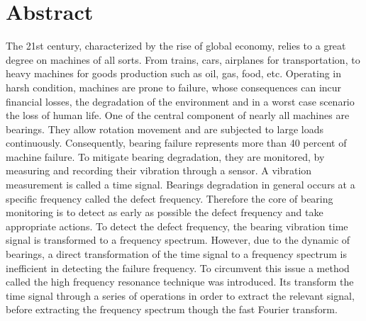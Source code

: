 \documentclass[../Main/thesis.tex]{subfiles}
\begin{document}
\null\vfill
{}
\chapter*{Abstract}

The 21st century, characterized by the rise of global economy, relies to a great degree on machines of all sorts. From trains, cars, airplanes for transportation, to heavy machines for goods production such as oil, gas, food, etc. Operating in harsh condition, machines are prone to failure, whose consequences can incur financial losses, the degradation of the environment and in a worst case scenario the loss of human life. 
\justify
 One of the central component of nearly all machines are bearings. They allow rotation movement and are subjected to large loads continuously. Consequently, bearing failure represents more than 40 percent of machine failure. To mitigate bearing degradation, they are monitored, by measuring and recording their vibration through a sensor. A vibration measurement is called a time signal. Bearings degradation in general occurs at a specific frequency called the defect frequency. Therefore the core of bearing monitoring is to detect as early as possible the defect frequency and take appropriate actions.
 \justify
 To detect the defect frequency, the bearing vibration time signal is transformed to a frequency spectrum. However, due to the dynamic of bearings, a direct transformation of the time signal to a frequency spectrum is inefficient in detecting the failure frequency. To circumvent this issue a method called the high frequency resonance technique was introduced. Its transform the time signal through a series of operations in order to extract the relevant signal, before extracting the frequency spectrum though the fast Fourier transform. 


\vfill\vfill
\clearpage
\blankpage
\end{document}
